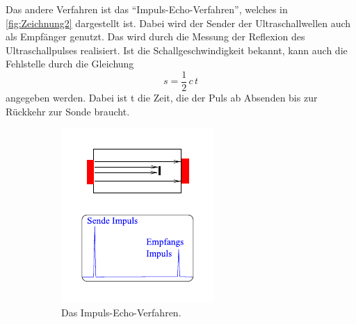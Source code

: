 Das andere Verfahren ist das \enquote{Impuls-Echo-Verfahren}, welches in \autoref{fig:Zeichnung2} dargestellt ist.
Dabei wird der Sender der Ultraschallwellen auch als Empfänger genutzt.
Das wird durch die Messung der Reflexion des Ultraschallpulses realisiert.
Ist die Schallgeschwindigkeit bekannt, kann auch die Fehlstelle durch die Gleichung
\begin{equation} \label{eq:s}
    s = \frac{1}{2} \, c \, t
\end{equation}
angegeben werden. Dabei ist t die Zeit, die der Puls ab Absenden bis zur Rückkehr zur Sonde braucht.
\begin{figure}
    \centering
    \begin{subfigure}{0.49\columnwidth}
        \centering
        \includegraphics[width=\textwidth]{pictures/Zeichnung1.pdf}
        \caption{Das Impuls-Echo-Verfahren.}
        \label{fig:Zeichnung1}
    \end{subfigure}
    \hfill
    \begin{subfigure}{0.49\columnwidth}
        \centering

\end{subfigure}
\end{figure}
